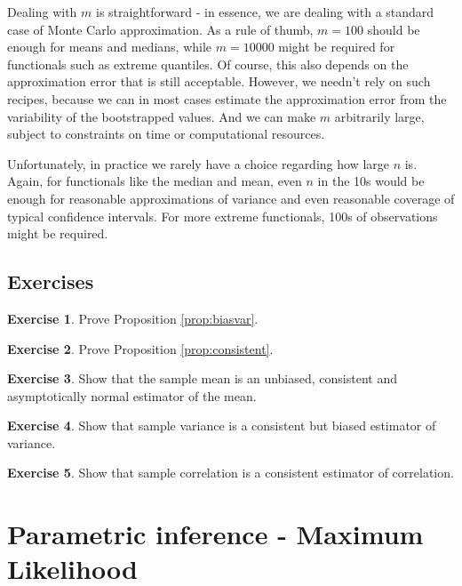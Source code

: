\documentclass{book}
\theoremstyle{plain}%
\theoremstyle{definition}
\newtheorem{exercise}{Exercise}[chapter]
\begin{document}
Dealing with $m$ is straightforward - in essence, we are dealing with a standard case of Monte Carlo approximation. As a rule of thumb, $m = 100$ should be enough for means and medians, while $m = 10000$ might be required for functionals such as extreme quantiles. Of course, this also depends on the approximation error that is still acceptable. However, we needn't rely on such recipes, because we can in most cases estimate the approximation error from the variability of the bootstrapped values. And we can make $m$ arbitrarily large, subject to constraints on time or computational resources.

Unfortunately, in practice we rarely have a choice regarding how large $n$ is. Again, for functionals like the median and mean, even $n$ in the 10s would be enough for reasonable approximations of variance and even reasonable coverage of typical confidence intervals. For more extreme functionals, 100s of observations might be required.

\section*{Exercises}

\begin{exercise}
Prove Proposition \ref{prop:biasvar}.
\end{exercise}

\begin{exercise}
Prove Proposition \ref{prop:consistent}.
\end{exercise}

\begin{exercise}
Show that the sample mean is an unbiased, consistent and asymptotically normal estimator of the mean.
\end{exercise}

\begin{exercise}
Show that sample variance is a consistent but biased estimator of variance.
\end{exercise}

\begin{exercise}
Show that sample correlation is a consistent estimator of correlation.
\end{exercise}



\chapter{Parametric inference - Maximum Likelihood}\label{ch:ml}
\end{document}
